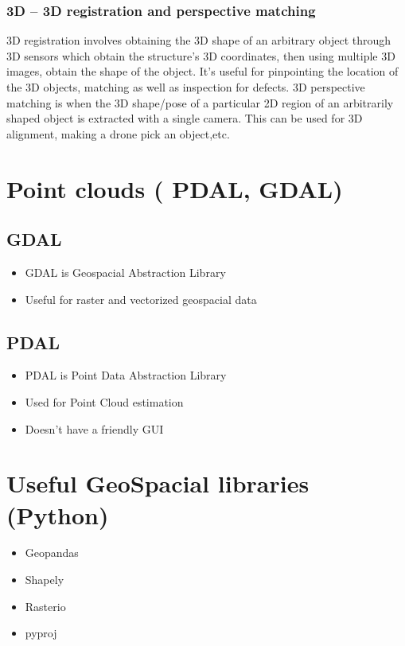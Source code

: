 \documentclass{article}[11pt]
\begin{document}
\subsubsection{3D – 3D registration and perspective matching}
3D registration involves obtaining the 3D shape of an arbitrary object through 3D sensors which obtain the structure's 3D coordinates, then using multiple 3D images, obtain the shape of the object. It's useful for pinpointing the location of the 3D objects, matching as well as inspection for defects.
3D perspective matching is when the 3D shape/pose of a particular 2D region of an arbitrarily shaped object is extracted with a single camera. This can be used for 3D alignment, making a drone pick an object,etc.




\section{Point clouds ( PDAL, GDAL)}
\subsection{GDAL}
\begin{itemize}
    \item GDAL is Geospacial Abstraction Library
    \item Useful for raster and vectorized geospacial data
    


\end{itemize}


\subsection{PDAL}

\begin{itemize}
    \item PDAL is Point Data Abstraction Library
    \item Used for Point Cloud estimation
    \item Doesn't have a friendly GUI
\end{itemize}


\section{Useful GeoSpacial libraries (Python)}
\begin{itemize}
    \item Geopandas
    \item Shapely 
    \item Rasterio
    \item pyproj
\end{itemize}
\end{document}
